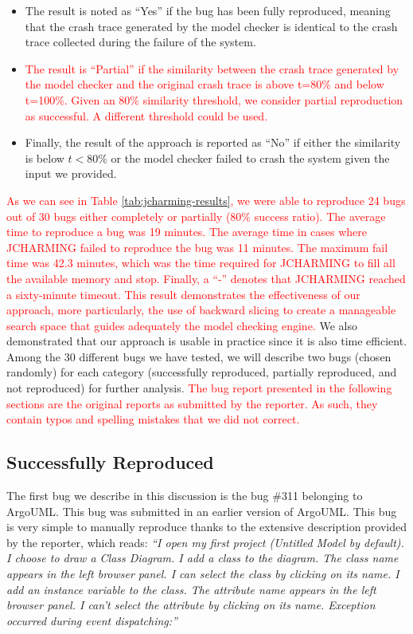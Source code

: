\documentclass[times, doublespace]{smrauth}
\newcommand{\red}[1]{\textcolor{red}{#1}}
\begin{document}
{\begin{itemize}
  \item The result is noted as ``Yes'' if the bug has been fully
reproduced, meaning that the crash trace generated by the
model checker is identical to the crash trace collected
during the failure of the system.
\item \red{The result is ``Partial'' if the similarity between the crash
trace generated by the model checker and the original
crash trace is above t=80\% and below t=100\%. Given an 80\% similarity
threshold, we consider partial reproduction as successful.
A different threshold could be used.}
\item Finally, the result of the approach is reported as ``No'' if
either the similarity is below $t < 80\%$ or the model
checker failed to crash the system given the input we
provided.
\end{itemize}


\red{As we can see in Table \ref{tab:jcharming-results}, we were able to reproduce 24 bugs
out of 30 bugs either completely or partially (80\% success ratio). The average time to reproduce a bug was 19 minutes. The average time in cases where JCHARMING failed to reproduce the bug  was 11 minutes. The maximum fail time was 42.3 minutes, which was the time
required for JCHARMING to fill all the available memory and stop. Finally, a ``-'' denotes that JCHARMING reached a sixty-minute timeout.
This result demonstrates the effectiveness of our approach,
more particularly, the use of backward slicing to create a
manageable search space that guides adequately the model
checking engine.} We also demonstrated that our approach is usable
in practice since it is also time efficient. Among the 30 different bugs we have tested, we will describe
two bugs (chosen randomly) for each category (successfully
reproduced, partially reproduced, and not reproduced) for
further analysis.
\red{The bug report presented in the following sections are the original reports as submitted by the reporter.
As such, they contain typos and spelling mistakes that we did not correct.}

\subsection{Successfully Reproduced}

The first bug we describe in this discussion is the bug \#311
belonging to ArgoUML. This bug was submitted in an earlier
version of ArgoUML. This bug is very simple to manually
reproduce thanks to the extensive description provided by the
reporter, which reads: {\it ``I open my first project (Untitled Model by default). I choose
to draw a Class Diagram. I add a class to the diagram. The
class name appears in the left browser panel. I can select the
class by clicking on its name. I add an instance variable to the
class. The attribute name appears in the left browser panel. I
can't select the attribute by clicking on its name. Exception
occurred during event dispatching:''}



}
\end{document}
